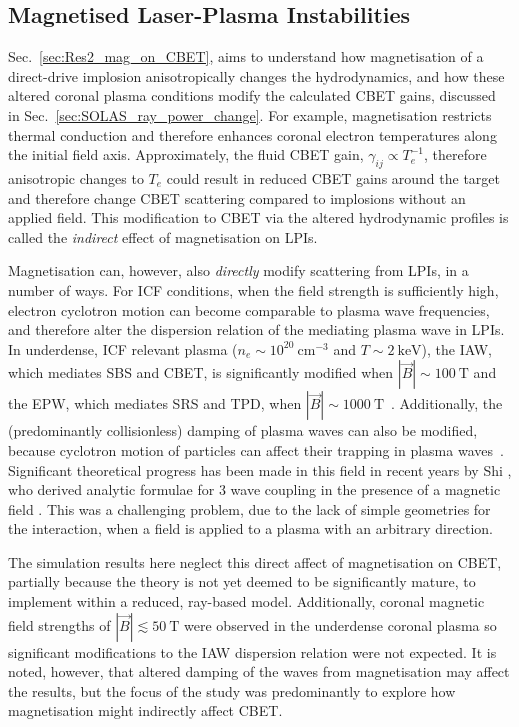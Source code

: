 \subsection{Magnetised Laser-Plasma Instabilities}%
\label{sec:Res2_maglpis}

Sec.~\ref{sec:Res2_mag_on_CBET}, aims to understand how magnetisation of a direct-drive implosion anisotropically changes the hydrodynamics, and how these altered coronal plasma conditions modify the calculated \ac{CBET} gains, discussed in Sec.~\ref{sec:SOLAS_ray_power_change}.
For example, magnetisation restricts thermal conduction and therefore enhances coronal electron temperatures along the initial field axis.
Approximately, the fluid \ac{CBET} gain, $\gamma_{ij}\propto T_e^{-1}$, therefore anisotropic changes to $T_e$ could result in reduced \ac{CBET} gains around the target and therefore change \ac{CBET} scattering compared to implosions without an applied field.
This modification to \ac{CBET} via the altered hydrodynamic profiles is called the \textit{indirect} effect of magnetisation on \ac{LPIs}.

Magnetisation can, however, also \textit{directly} modify scattering from \ac{LPIs}, in a number of ways.
For \ac{ICF} conditions, when the field strength is sufficiently high, electron cyclotron motion can become comparable to plasma wave frequencies, and therefore alter the dispersion relation of the mediating plasma wave in \ac{LPIs}.
In underdense, \ac{ICF} relevant plasma ($n_e \sim 10^{20}\ \text{cm}^{-3}$ and $T\sim2\ \text{keV}$), the \ac{IAW}, which mediates \ac{SBS} and \ac{CBET}, is significantly modified when $|\vec{B}|\sim100\ \text{T}$ and the \ac{EPW}, which mediates \ac{SRS} and \ac{TPD}, when $|\vec{B}|\sim1000\ \text{T}$~\cite{shi_benchmarking_2023}.
Additionally, the (predominantly collisionless) damping of plasma waves can also be modified, because cyclotron motion of particles can affect their trapping in plasma waves~\cite{shi_benchmarking_2023}.
Significant theoretical progress has been made in this field in recent years by Shi , who derived analytic formulae for 3 wave coupling in the presence of a magnetic field \cite{shi_three-wave_2017,shi_laser-plasma_2018}.
This was a challenging problem, due to the lack of simple geometries for the interaction, when a field is applied to a plasma with an arbitrary direction.

The simulation results here neglect this direct affect of magnetisation on \ac{CBET}, partially because the theory is not yet deemed to be significantly mature, to implement within a reduced, ray-based model.
Additionally, coronal magnetic field strengths of $|\vec{B}|\lesssim50\ \text{T}$ were observed in the underdense coronal plasma so significant modifications to the \ac{IAW} dispersion relation were not expected.
It is noted, however, that altered damping of the waves from magnetisation may affect the results, but the focus of the study was predominantly to explore how magnetisation might indirectly affect \ac{CBET}.

